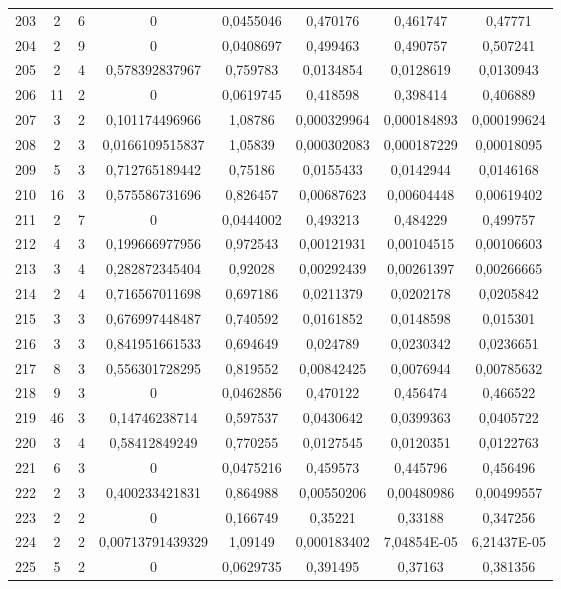 \begin{longtable}{|c|c|c|c|c|c|c|c|}
203 & 2 & 6 & 0 & 0,0455046 & 0,470176 & 0,461747 & 0,47771  \\
204 & 2 & 9 & 0 & 0,0408697 & 0,499463 & 0,490757 & 0,507241  \\
205 & 2 & 4 & 0,578392837967 & 0,759783 & 0,0134854 & 0,0128619 & 0,0130943  \\
206 & 11 & 2 & 0 & 0,0619745 & 0,418598 & 0,398414 & 0,406889  \\
207 & 3 & 2 & 0,101174496966 & 1,08786 & 0,000329964 & 0,000184893 & 0,000199624  \\
208 & 2 & 3 & 0,0166109515837 & 1,05839 & 0,000302083 & 0,000187229 & 0,00018095  \\
209 & 5 & 3 & 0,712765189442 & 0,75186 & 0,0155433 & 0,0142944 & 0,0146168  \\
210 & 16 & 3 & 0,575586731696 & 0,826457 & 0,00687623 & 0,00604448 & 0,00619402  \\
211 & 2 & 7 & 0 & 0,0444002 & 0,493213 & 0,484229 & 0,499757  \\
212 & 4 & 3 & 0,199666977956 & 0,972543 & 0,00121931 & 0,00104515 & 0,00106603  \\
213 & 3 & 4 & 0,282872345404 & 0,92028 & 0,00292439 & 0,00261397 & 0,00266665  \\
214 & 2 & 4 & 0,716567011698 & 0,697186 & 0,0211379 & 0,0202178 & 0,0205842  \\
215 & 3 & 3 & 0,676997448487 & 0,740592 & 0,0161852 & 0,0148598 & 0,015301  \\
216 & 3 & 3 & 0,841951661533 & 0,694649 & 0,024789 & 0,0230342 & 0,0236651  \\
217 & 8 & 3 & 0,556301728295 & 0,819552 & 0,00842425 & 0,0076944 & 0,00785632  \\
218 & 9 & 3 & 0 & 0,0462856 & 0,470122 & 0,456474 & 0,466522  \\
219 & 46 & 3 & 0,14746238714 & 0,597537 & 0,0430642 & 0,0399363 & 0,0405722  \\
220 & 3 & 4 & 0,58412849249 & 0,770255 & 0,0127545 & 0,0120351 & 0,0122763  \\
221 & 6 & 3 & 0 & 0,0475216 & 0,459573 & 0,445796 & 0,456496  \\
222 & 2 & 3 & 0,400233421831 & 0,864988 & 0,00550206 & 0,00480986 & 0,00499557  \\
223 & 2 & 2 & 0 & 0,166749 & 0,35221 & 0,33188 & 0,347256  \\
224 & 2 & 2 & 0,00713791439329 & 1,09149 & 0,000183402 & 7,04854E-05 & 6,21437E-05  \\
225 & 5 & 2 & 0 & 0,0629735 & 0,391495 & 0,37163 & 0,381356  \\

\end{longtable}

